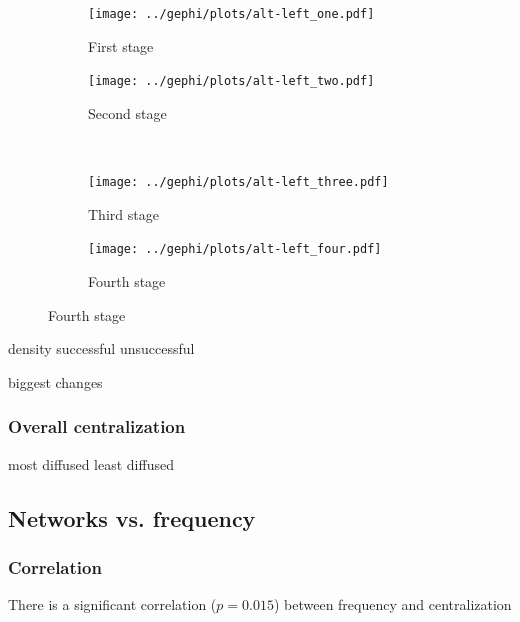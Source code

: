 \documentclass[
  a4paper,
  abstract=on,
  captions=tableabove
  ]{scrartcl}
\begin{document}

      \begin{figure}[H]
        \caption{Social network of diffusion for \emph{alt-left} over time.}
        \centering
        \begin{subfigure}{.45\linewidth}
          \caption{First stage}
          \centering
          \texttt{[image: ../gephi/plots/alt-left\_one.pdf]}
        \end{subfigure}
        \begin{subfigure}{.45\linewidth}
          \caption{Second stage}
          \centering
          \texttt{[image: ../gephi/plots/alt-left\_two.pdf]}
        \end{subfigure}\\
        \begin{subfigure}{.45\linewidth}
          \caption{Third stage}
          \centering
          \texttt{[image: ../gephi/plots/alt-left\_three.pdf]}
        \end{subfigure}
        \begin{subfigure}{.45\linewidth}
          \caption{Fourth stage}
          \centering
          \texttt{[image: ../gephi/plots/alt-left\_four.pdf]}
        \end{subfigure}
      \end{figure}


  density
  successful
  unsuccessful

  biggest changes

    \subsubsection{Overall centralization}

  most diffused
  least diffused

  \subsection{Networks vs. frequency}
    \label{subsec:nets-vs-freq}

    \subsubsection{Correlation}
      \label{subsubsec:corr}

  There is a significant correlation ($p = 0.015$) between frequency and centralization
\end{document}
